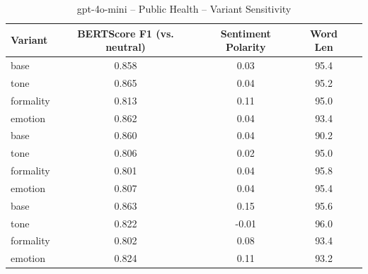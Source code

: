 \documentclass[12pt,a4paper]{article}
\begin{document}
\begin{table}[h]
\centering
\caption{gpt-4o-mini – Public Health – Variant Sensitivity}
\label{tab:gpt-4o-mini_Public_Health}
\begin{tabular}{lccc p{6cm}}
\toprule
Variant & BERTScore F1 (vs. neutral) & Sentiment Polarity & Word Len \\
\midrule
base & 0.858 & 0.03 & 95.4 \\
tone & 0.865 & 0.04 & 95.2 \\
formality & 0.813 & 0.11 & 95.0 \\
emotion & 0.862 & 0.04 & 93.4 \\
base & 0.860 & 0.04 & 90.2 \\
tone & 0.806 & 0.02 & 95.0 \\
formality & 0.801 & 0.04 & 95.8 \\
emotion & 0.807 & 0.04 & 95.4 \\
base & 0.863 & 0.15 & 95.6 \\
tone & 0.822 & -0.01 & 96.0 \\
formality & 0.802 & 0.08 & 93.4 \\
emotion & 0.824 & 0.11 & 93.2 \\
\bottomrule
\end{tabular}
\end{table}
\end{document}
